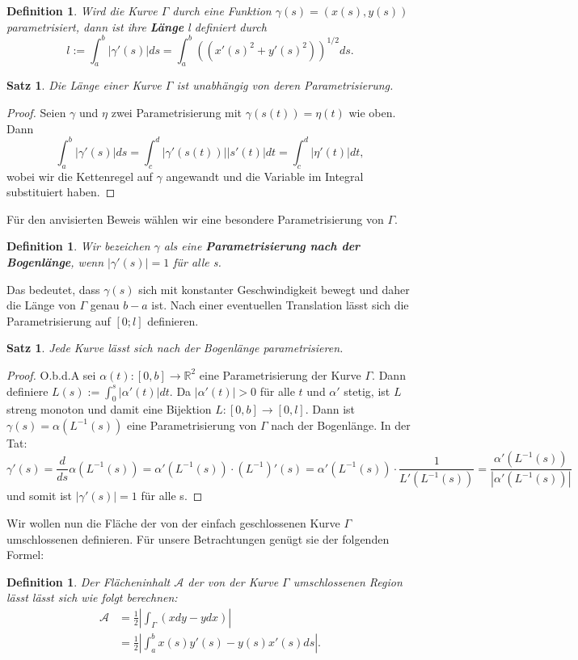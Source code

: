 \documentclass[12pt,a4paper]{article}
\theoremstyle{plain}
\newtheorem{Satz}[Theorem]{Satz}
\newtheorem{Definition}[Theorem]{Definition}
\newcommand{\herv}[1]{{\emph{\textbf{#1}}}}
\newcommand{\R}{\mathbb{R}}
\numberwithin{equation}{section}
\begin{document}
\begin{Definition}
Wird die Kurve $\Gamma$ durch eine Funktion $\gamma(s)=(x(s),y(s))$ parametrisiert, dann ist ihre \herv{Länge} l definiert durch \[
l:=\int_a^b{|\gamma'(s)|ds}=\int_a^b {\left((x'(s)^2+y'(s)^2)\right)^{1/2}ds}.\]
\end{Definition}
\begin{Satz}
Die Länge einer Kurve $\Gamma$ ist unabhängig von deren Parametrisierung.
\end{Satz}
\begin{proof}
Seien $\gamma$ und $\eta$ zwei Parametrisierung mit $\gamma(s(t))=\eta(t)$ wie oben. Dann \[ \int_a^b{|\gamma'(s)|ds} = \int_c^d{|\gamma'(s(t))||s'(t)|dt} = \int_c^d{|\eta'(t)|dt} ,\] wobei wir die Kettenregel auf $\gamma$ angewandt und die Variable im Integral substituiert haben.
\end{proof}
Für den anvisierten Beweis wählen wir eine besondere Parametrisierung von $\Gamma$.
\begin{Definition}
Wir bezeichen $\gamma$ als eine \herv{Parametrisierung nach der Bogenlänge}, wenn $|\gamma'(s)|=1$ für alle s.
\end{Definition}
Das bedeutet, dass $\gamma(s)$ sich mit konstanter Geschwindigkeit bewegt und daher die Länge von $\Gamma$ genau $b-a$ ist. Nach einer eventuellen Translation lässt sich die Parametrisierung auf $[0;l]$ definieren.
\begin{Satz}
Jede Kurve lässt sich nach der Bogenlänge parametrisieren.
\end{Satz}
\begin{proof}
O.b.d.A sei $\alpha(t):[0,b]\rightarrow \R^2$ eine Parametrisierung der Kurve $\Gamma$. Dann definiere $L(s):=\int_0^s{|\alpha'(t)|dt}$. Da $|\alpha'(t)| > 0$ für alle $t$ und $\alpha'$ stetig, ist $L$ streng monoton und damit eine Bijektion $L:[0,b]\rightarrow [0,l]$. Dann ist $\gamma(s)=\alpha(L^{-1}(s))$ eine Parametrisierung von $\Gamma$ nach der Bogenlänge. In der Tat: \[\gamma'(s)=\frac{d}{ds}\alpha(L^{-1}(s))=\alpha'({L^{-1}(s)})\cdot (L^{-1})'(s) = \alpha'(L^{-1}(s))\cdot \frac{1}{L'(L^{-1}(s))}= \frac{\alpha'(L^{-1}(s))}{|\alpha'(L^{-1}(s))|}\] und somit ist $|\gamma'(s)|=1$ für alle s.
\end{proof}
Wir wollen nun die Fläche der von der einfach geschlossenen Kurve $\Gamma$ umschlossenen definieren. Für unsere Betrachtungen genügt sie der folgenden Formel:
\begin{Definition}
Der Flächeninhalt $\mathcal{A}$ der von der Kurve $\Gamma$ umschlossenen Region lässt lässt sich wie folgt berechnen:
\begin{align*}
\mathcal{A}&=\frac{1}{2}\left|\int_\Gamma (x dy -y dx) \right| \\
&= \frac{1}{2}\left|\int_a^b x(s)y'(s)-y(s)x'(s) ds \right| .
\end{align*}
\end{Definition}
\end{document}
